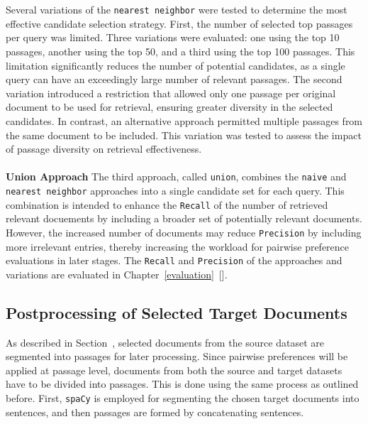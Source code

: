 \\\\
Several variations of the \texttt{nearest neighbor} were tested to determine the most effective candidate selection strategy. First, the number of selected top passages per query was limited. Three variations were evaluated: one using the top 10 passages, another using the top 50, and a third using the top 100 passages. This limitation significantly reduces the number of potential candidates, as a single query can have an exceedingly large number of relevant passages. The second variation introduced a restriction that allowed only one passage per original document to be used for retrieval, ensuring greater diversity in the selected candidates. In contrast, an alternative approach permitted multiple passages from the same document to be included. This variation was tested to assess the impact of passage diversity on retrieval effectiveness.
\\\\
\textbf{Union Approach} The third approach, called \texttt{union}, combines the \texttt{naive} and \texttt{nearest neighbor} approaches into a single candidate set for each query. This combination is intended to enhance the \texttt{Recall} of the number of retrieved relevant docuements by including a broader set of potentially relevant documents. However, the increased number of documents may reduce \texttt{Precision} by including more irrelevant entries, thereby increasing the workload for pairwise preference evaluations in later stages. The \texttt{Recall} and \texttt{Precision} of the approaches and variations are evaluated in Chapter~\ref{evaluation}~[].

\subsection{Postprocessing of Selected Target Documents}\label{postprocessing-of-selected-target-documents}

As described in Section~, selected documents from the source dataset are segmented into passages for later processing. Since pairwise preferences will be applied at passage level, documents from both the source and target datasets have to be divided into passages. This is done using the same process as outlined before. First, \texttt{spaCy} is employed for segmenting the chosen target documents into sentences, and then passages are formed by concatenating sentences.

